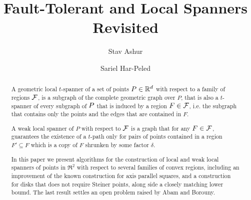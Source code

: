 \documentclass[12pt]{article}%
\begin{document}
\title{Fault-Tolerant and Local Spanners Revisited}
	
\author{%
   Stav Ashur%
   \StavThanks{}%
   \and%
   Sariel Har-Peled%
}%
	
\maketitle



\begin{abstract}
	
	A geometric local $t$-spanner of a set of points $P\in \mathbb{R}^d $ with
	respect to a family of regions $\mathcal{F}$, is a subgraph of the complete
	geometric graph over $P$, that is also a $t$-spanner of every
	subgraph of $P$ that is induced by a region $F\in \mathcal{F}$, i.e. the
	subgraph that contains only the points and the edges that are
	contained in $F$.
	
	
	A weak local spanner of $P$ with respect to $\mathcal{F}$ is a graph that
	for any $F\in\mathcal{F}$, guarantees the existence of a $t$-path only for
	pairs of points contained in a region $F'\subseteq F$ which is a
	copy of $F$ shrunken by some factor $\delta$.
	
	In this paper we present algorithms for the construction of local
	and weak local spanners of points in $\Re^2$ with respect to
	several families of	convex regions, including an improvement of the
	known construction for axis parallel squares, and a construction for
	disks that does not require Steiner points, along side a closely
	matching lower boumd. The last result settles an open problem raised
	by Abam and Borouny. 
\end{abstract}
\end{document}
